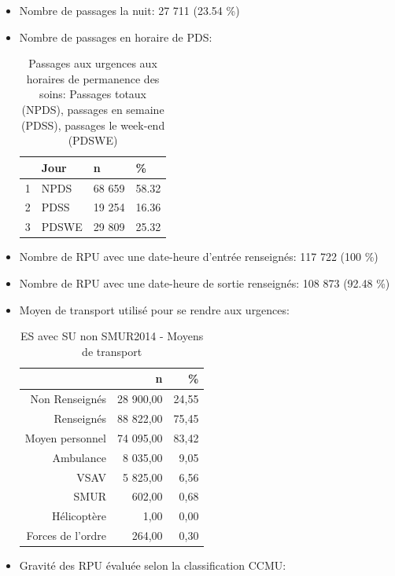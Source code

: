 \documentclass[]{article}
\begin{document}
\begin{itemize}
\item
  Nombre de passages la nuit: 27 711 (23.54 \%)
\item
  Nombre de passages en horaire de PDS:

  \begin{table}[ht]
  \centering
  \begin{tabular}{rlll}
    \hline
   & Jour & n & \% \\ 
    \hline
  1 & NPDS & 68 659 & 58.32 \\ 
    2 & PDSS & 19 254 & 16.36 \\ 
    3 & PDSWE & 29 809 & 25.32 \\ 
     \hline
  \end{tabular}
  \caption{Passages aux urgences aux horaires de permanence des soins: Passages totaux (NPDS), passages  en semaine (PDSS), passages le week-end (PDSWE)} 
  \end{table}
\item
  Nombre de RPU avec une date-heure d'entrée renseignés: 117 722 (100
  \%)
\item
  Nombre de RPU avec une date-heure de sortie renseignés: 108 873 (92.48
  \%)
\item
  Moyen de transport utilisé pour se rendre aux urgences:

  \begin{table}[ht]
  \centering
  \begin{tabular}{rrr}
    \hline
   & n & \% \\ 
    \hline
  Non Renseignés & 28 900,00 & 24,55 \\ 
    Renseignés & 88 822,00 & 75,45 \\ 
    Moyen personnel & 74 095,00 & 83,42 \\ 
    Ambulance & 8 035,00 & 9,05 \\ 
    VSAV & 5 825,00 & 6,56 \\ 
    SMUR & 602,00 & 0,68 \\ 
    Hélicoptère & 1,00 & 0,00 \\ 
    Forces de l'ordre & 264,00 & 0,30 \\ 
     \hline
  \end{tabular}
  \caption{ES avec SU non SMUR2014 - Moyens de transport} 
  \end{table}
\item
  Gravité des RPU évaluée selon la classification CCMU:


\end{itemize}
\end{document}
